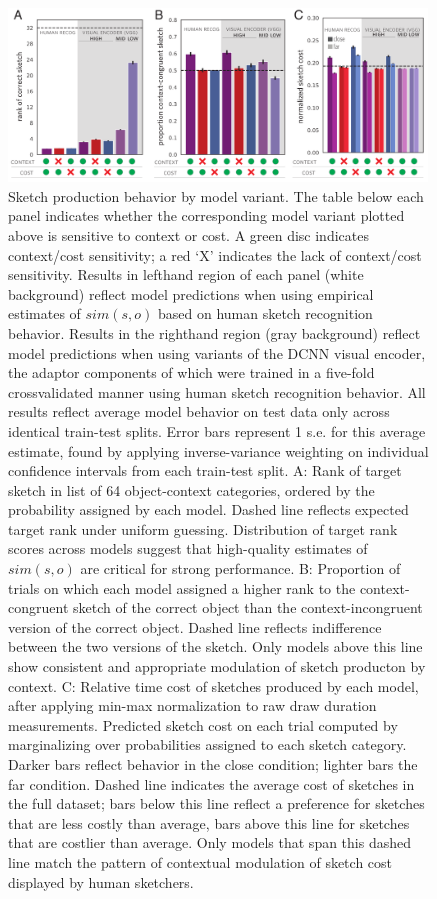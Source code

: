 \documentclass[9pt,twocolumn,twoside]{pnas-new}
\begin{document}
\begin{figure}[htbp]
\centering
\includegraphics[width=0.99\textwidth]{figures/5_model_results_2.pdf}
\caption{Sketch production behavior by model variant. The table below each panel indicates whether the corresponding model variant plotted above is sensitive to context or cost. A green disc indicates context/cost sensitivity; a red `X' indicates the lack of context/cost sensitivity. 
Results in lefthand region of each panel (white background) reflect model predictions when using empirical estimates of $sim(s,o)$ based on human sketch recognition behavior. 
Results in the righthand region (gray background) reflect model predictions when using variants of the DCNN visual encoder, the adaptor components of which were trained in a five-fold crossvalidated manner using human sketch recognition behavior. 
All results reflect average model behavior on test data only across identical train-test splits. 
Error bars represent 1 s.e. for this average estimate, found by applying inverse-variance weighting on individual confidence intervals from each train-test split. 
A: Rank of target sketch in list of 64 object-context categories, ordered by the probability assigned by each model. 
Dashed line reflects expected target rank under uniform guessing. 
Distribution of target rank scores across models suggest that high-quality estimates of $sim(s,o)$ are critical for strong performance. 
B: Proportion of trials on which each model assigned a higher rank to the context-congruent sketch of the correct object than the context-incongruent version of the correct object. 
Dashed line reflects indifference between the two versions of the sketch. 
Only models above this line show consistent and appropriate modulation of sketch producton by context. C: Relative time cost of sketches produced by each model, after applying min-max normalization to raw draw duration measurements. 
Predicted sketch cost on each trial computed by marginalizing over probabilities assigned to each sketch category. 
Darker bars reflect behavior in the close condition; lighter bars the far condition. 
Dashed line indicates the average cost of sketches in the full dataset; bars below this line reflect a preference for sketches that are less costly than average, bars above this line for sketches that are costlier than average. 
Only models that span this dashed line match the pattern of contextual modulation of sketch cost displayed by human sketchers.}
\label{model_results}
\end{figure}
\end{document}
